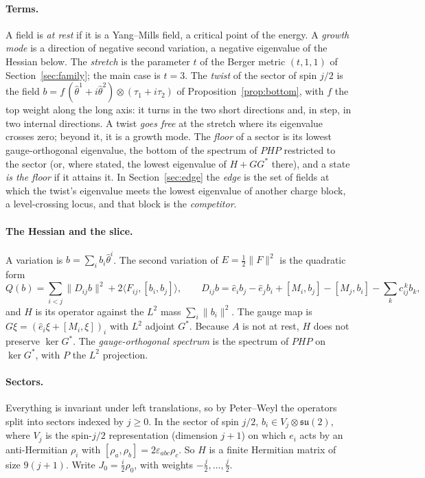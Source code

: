 \documentclass[11pt]{article}
\theoremstyle{definition}
\theoremstyle{remark}
\newif\ifredline
\newcommand{\redins}[1]{\ifredline{\color{blue}#1}\else#1\fi}
\newcommand{\su}{\mathfrak{su}(2)}
\newcommand{\norm}[1]{\lVert #1\rVert}
\begin{document}
\paragraph{Terms.} A field is \emph{at rest} if it is a Yang--Mills field, a critical point of the
energy. A \emph{growth mode} is a direction of negative second variation, a negative eigenvalue of the Hessian
below. The \emph{stretch} is the parameter $t$ of the Berger metric $(t,1,1)$ of Section~\ref{sec:family}; the
main case is $t=3$. The \emph{twist} of the sector of spin $j/2$ is the field
$b=f\,(\hat\theta^1+i\hat\theta^2)\otimes(\tau_1+i\tau_2)$ of Proposition~\ref{prop:bottom}, with $f$ the top
weight along the long axis: it turns in the two short directions and, in step, in two internal directions. A
twist \emph{goes free} at the stretch where its eigenvalue crosses zero; beyond it, it is a growth mode.\redins{ The
\emph{floor} of a sector is its lowest gauge-orthogonal eigenvalue, the bottom of the spectrum of $PHP$ restricted to
the sector (or, where stated, the lowest eigenvalue of $H+GG^*$ there), and a state \emph{is the floor} if it attains
it. In Section~\ref{sec:edge} the \emph{edge} is the set of fields at which the twist's eigenvalue meets the lowest
eigenvalue of another charge block, a level-crossing locus, and that block is the \emph{competitor}.}

\paragraph{The Hessian and the slice.} A variation is $b=\sum_ib_i\hat\theta^i$. The second variation
of $E=\tfrac12\norm{F}^2$ is the quadratic form
\begin{equation}\label{eq:Q}
  Q(b)=\sum_{i<j}\norm{D_{ij}b}^2+2\langle F_{ij},[b_i,b_j]\rangle,\qquad
  D_{ij}b=\hat e_ib_j-\hat e_jb_i+[M_i,b_j]-[M_j,b_i]-\textstyle\sum_kc_{ij}^{\,k}b_k,
\end{equation}
and $H$ is its operator against the $L^2$ mass $\sum_i\norm{b_i}^2$. The gauge map is
$G\xi=(\hat e_i\xi+[M_i,\xi])_i$ with $L^2$ adjoint $G^*$. Because $A$ is not at rest, $H$ does not
preserve $\ker G^*$. The \emph{gauge-orthogonal spectrum} is the spectrum of $PHP$ on $\ker G^*$, with
$P$ the $L^2$ projection.

\paragraph{Sectors.} Everything is invariant under left translations, so by Peter--Weyl the operators
split into sectors indexed by $j\ge0$. In the sector of spin $j/2$, $b_i\in V_j\otimes\su$, where
$V_j$ is the spin-$j/2$ representation (dimension $j+1$) on which $e_i$ acts by an anti-Hermitian
$\rho_i$ with $[\rho_a,\rho_b]=2\varepsilon_{abc}\rho_c$. So $H$ is a finite Hermitian matrix of size
$9(j+1)$. Write $J_0=\tfrac i2\rho_0$, with weights $-\tfrac j2,\dots,\tfrac j2$.
\end{document}
